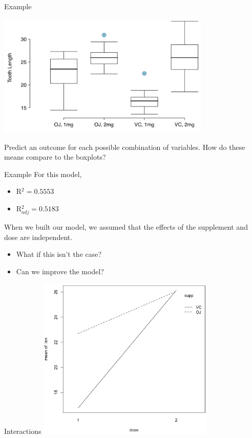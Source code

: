 \begin{frame}{Example}
    \begin{center}
        \includegraphics[width=4in]{images/toothbox.png}
    \end{center}
    Predict an outcome for each possible combination of variables. How do these means compare to the boxplots?
\end{frame}

\begin{frame}{Example}
    For this model,
    \begin{itemize}
        \item R$^2 = 0.5553$
        \item R$^2_{adj} = 0.5183$ 
    \end{itemize}
    
    \vspace{12pt}When we built our model, we assumed that the effects of the supplement and dose are independent. 
    \begin{itemize}
        \item What if this isn't the case?
        \item Can we improve the model?
    \end{itemize}
\end{frame}

\begin{frame}{Interactions}
    \centering
    \includegraphics[width=3.3in]{images/toothint2.png}
\end{frame}

